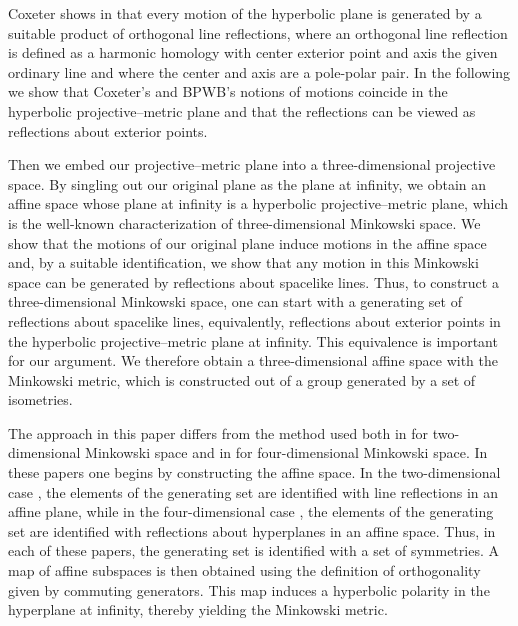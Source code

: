 \documentclass[a4paper,twoside,12pt]{article}
\begin{document}
     Coxeter shows in \cite{Cox3} that every motion of the hyperbolic
plane is generated by a suitable product of orthogonal line
reflections, where an orthogonal line reflection is defined as a
harmonic homology with center exterior point and axis the given
ordinary line and where the center and axis are a pole-polar pair. In
the following we show that Coxeter's and BPWB's notions of motions
coincide in the hyperbolic projective--metric plane and that the
reflections can be viewed as reflections about exterior points.

     Then we embed our projective--metric plane into a
three-dimensional projective space. By singling out our original plane
as the plane at infinity, we obtain an affine space whose plane at
infinity is a hyperbolic projective--metric plane, which is the
well-known characterization of three-dimensional Minkowski space.
We show that the motions of our original plane induce motions
in the affine space and, by a suitable identification, we show that
any motion in this Minkowski space can be generated by reflections
about spacelike lines. Thus, to construct a three-dimensional
Minkowski space, one can start with a generating set \coordHE{} of
reflections about spacelike lines, equivalently, reflections about
exterior points in the hyperbolic projective--metric plane at infinity. 
This equivalence is important for our argument. We therefore
obtain a three-dimensional affine space with the Minkowski metric, which is
constructed out of a group generated by a set of isometries. 

     The approach in this paper differs from the method used both in
\cite{Wo} for two-dimensional Minkowski space and in \cite{KO} for
four-dimensional Minkowski space. In these papers one begins by
constructing the affine space. In the two-dimensional case \cite{Wo},
the elements of the generating set \coordHE{} are identified with
line reflections in an affine plane, while in the four-dimensional
case \cite{KO}, the elements of the generating set \coordHE{} are
identified with reflections about hyperplanes in an affine
space. Thus, in each of these papers, the generating set \coordHE{}
is identified with a set of symmetries. A map of affine subspaces is
then obtained using the definition of orthogonality given by commuting
generators. This map induces a hyperbolic polarity in the hyperplane
at infinity, thereby yielding the Minkowski metric.
\end{document}
